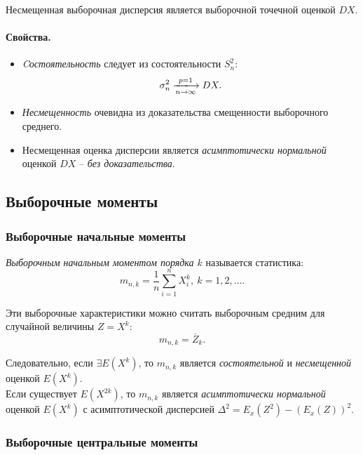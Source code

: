 Несмещенная выборочная дисперсия является выборочной точечной оценкой $DX$.

\paragraph{Свойства.}
\begin{itemize}
  \item \textit{Cостоятельность} следует из состоятельности $S^2_n$:
  \[
    \sigma^2_n \xlongrightarrow[n \to \infty]{p = 1} DX
  .\]
  \item \textit{Несмещенность} очевидна из доказательства смещенности
  выборочного среднего.

  \item Несмещенная оценка дисперсии является \textit{асимптотически нормальной}
  оценкой $DX$ -- \textit{без доказательства}.
\end{itemize}

\subsection{Выборочные моменты}

\subsubsection{Выборочные начальные моменты}

\begin{definition}
  \textit{Выборочным начальным моментом порядка $k$} называется статистика:
  \[
    m_{n, k} = \frac{1}{n} \sum\limits_{i = 1}^{n} X^k_i,~ k = 1, 2, \ldots
  .\]
\end{definition}

Эти выборочные характеристики можно считать выборочным средним для случайной
величины $Z = X^k$:
\[
  m_{n, k} = \overline{Z}_k
.\]

Следовательно, если $\exists E(X^k)$, то $m_{n, k}$ является
\textit{состоятельной} и \textit{несмещенной} оценкой $E(X^k)$.\\

Если существует $E(X^{2k})$, то $m_{n, k}$ является \textit{асимптотически
нормальной} оценкой $E(X^k)$ с асимптотической дисперсией
$\Delta^2 = E_x(Z^2) - (E_x(Z))^2$.

\subsubsection{Выборочные центральные моменты}

